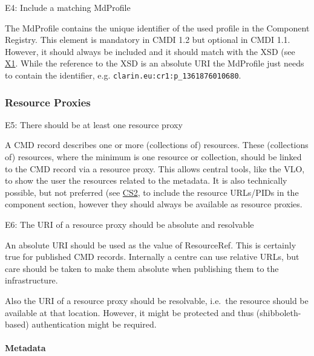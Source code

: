 E4: Include a matching MdProfile

 

The MdProfile contains the unique identifier of the used profile in the Component Registry. This element is mandatory in CMDI 1.2 but optional in CMDI 1.1. However, it should always be included and it should match with the XSD (see \hyperref[x1]{X1}. While the reference to the XSD is an absolute URI the MdProfile just needs to contain the identifier, e.g.
\texttt{clarin.eu:cr1:p\_1361876010680}.

\subsubsection{Resource Proxies}\label{resource-proxies}

\label{e5}
E5: There should be at least one resource proxy

 

A CMD record describes one or more (collections of) resources. These (collections of) resources, where the minimum is one resource or collection, should be linked to the CMD record via a resource proxy. This allows central tools, like the VLO, to show the user the resources related to the metadata. It is also technically possible, but not preferred (see \hyperref[cs2]{CS2}, to include the resource URLs/PIDs in the component section, however they should always be available as resource proxies.

E6: The URI of a resource proxy should be absolute and resolvable

 

An absolute URI should be used as the value of ResourceRef. This is certainly true for published CMD records. Internally a centre can use relative URLs, but care should be taken to make them absolute when publishing them to the infrastructure.

Also the URI of a resource proxy should be resolvable, i.e.~the resource should be available at that location. However, it might be protected and thus (shibboleth-based) authentication might be required.

\paragraph{Metadata}\label{metadata}

